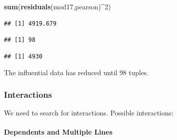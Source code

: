 \documentclass[
  twoside]{article}
\newenvironment{Shaded}{\begin{snugshade}}{\end{snugshade}}
\newcommand{\ConstantTok}[1]{\textcolor[rgb]{0.56,0.35,0.01}{#1}}
\newcommand{\DecValTok}[1]{\textcolor[rgb]{0.00,0.00,0.81}{#1}}
\newcommand{\FunctionTok}[1]{\textcolor[rgb]{0.13,0.29,0.53}{\textbf{#1}}}
\newcommand{\NormalTok}[1]{#1}
\newcommand{\OtherTok}[1]{\textcolor[rgb]{0.56,0.35,0.01}{#1}}
\newcommand{\SpecialCharTok}[1]{\textcolor[rgb]{0.81,0.36,0.00}{\textbf{#1}}}
\newcommand{\StringTok}[1]{\textcolor[rgb]{0.31,0.60,0.02}{#1}}
\begin{document}
\begin{Shaded}
\begin{Highlighting}[]
\FunctionTok{sum}\NormalTok{(}\FunctionTok{residuals}\NormalTok{(mod17,}\StringTok{\textquotesingle{}pearson\textquotesingle{}}\NormalTok{)}\SpecialCharTok{\^{}}\DecValTok{2}\NormalTok{)}
\end{Highlighting}
\end{Shaded}

\begin{verbatim}
## [1] 4919.679
\end{verbatim}

\begin{Shaded}
\end{Shaded}

\begin{verbatim}
## [1] 98
\end{verbatim}

\begin{Shaded}
\end{Shaded}

\begin{verbatim}
## [1] 4930
\end{verbatim}

The influential data has reduced until 98 tuples.

\hypertarget{interactions}{%
\subsubsection{Interactions}\label{interactions}}

We need to search for interactions. Possible interactions:

\hypertarget{dependents-and-multiple-lines}{%
\paragraph{Dependents and Multiple
Lines}\label{dependents-and-multiple-lines}}
\end{document}
